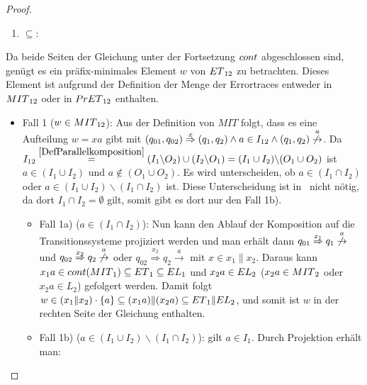 \begin{proof}
  ~
  \begin{enumerate}
    \item \glqq $\subseteq$\grqq :
  \end{enumerate}
  \vspace{-0.3cm}
  Da beide Seiten der Gleichung unter der Fortsetzung $cont{}$ abgeschlossen sind, genügt es ein
  präfix-minimales Element $w$ von $ET{}_{12}$ zu betrachten. Dieses Element ist
  aufgrund der Definition der Menge der Errortraces entweder in $MIT{}_{12}$ oder in
  $PrET{}_{12}$ enthalten.\\
  \begin{itemize}
    \item Fall 1 ($w\in MIT{}_{12}$): Aus der Definition von $MIT$ folgt, dass es eine
  Aufteilung $w=xa$ gibt mit $(q_{01},q_{02})
  \overset{x}{\Rightarrow}(q_1,q_2)\wedge a\in I_{12}\wedge (q_1,q_2)
  \overset{a}{\not{\hspace{-0.1cm}\rightarrow}}$. Da $I_{12}
  \overset{\ref{DefParallelkomposition}}{=}(I_1\backslash O_2)\cup
  (I_2\backslash O_1)=(I_1\cup I_2)\backslash (O_1\cup O_2)$ ist $a\in (I_1\cup
  I_2)$ und $a\notin (O_1\cup O_2)$. Es wird unterscheiden, ob $a\in (I_1\cap I_2)$
  oder $a\in (I_1\cup I_2)\backslash (I_1\cap I_2)$ ist. Diese Unterscheidung
  ist in~\cite{Vogler2014EIO} nicht nötig, da dort $I_1\cap I_2=\emptyset$
  gilt, somit gibt es dort nur den Fall 1b).
  \begin{itemize}
    \item Fall 1a) ($a\in (I_1\cap I_2)$): Nun kann den Ablauf der
      Komposition auf die Transitionssysteme projiziert werden und man erhält dann \oBdA{}
      $q_{01}\overset{x_1}{\Rightarrow} q_1
      \overset{a}{\not{\hspace{-0.1cm}\rightarrow}}$ und
      $q_{02}\overset{x_2}{\Rightarrow} q_2
      \overset{a}{\not{\hspace{-0.1cm}\rightarrow}}$ oder
      $q_{02}\overset{x_2}{\Rightarrow} q_2 \overset{a}{\rightarrow}$ mit $x\in
      x_1\|x_2$. Daraus kann $x_1a\in cont{}(MIT{}_1)\subseteq ET{}_1\subseteq
      EL{}_1$ und $x_2a\in EL{}_2$ ($x_2a\in MIT{}_2$ oder $x_2a\in L_2$)
      gefolgert werden. Damit folgt $w\in (x_1\|x_2)\cdot\{a\}\subseteq
      (x_1a)\|(x_2a)\subseteq ET{}_1\|EL{}_2$, und somit ist $w$ in der
      rechten Seite der Gleichung enthalten.
  \item Fall 1b) ($a\in (I_1\cup I_2)\backslash(I_1\cap I_2)$): \OBdA{} gilt
      $a\in I_1$. Durch Projektion erhält man:

\end{itemize}
\end{itemize}
\end{proof}
